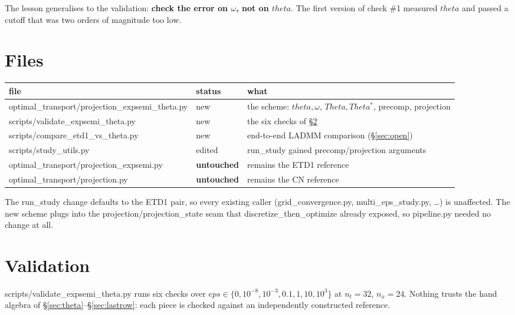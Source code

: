 \documentclass[11pt]{article}
\newcommand{\eps}{\varepsilon}
\newcommand{\dt}{\Delta t}
\newcommand{\dx}{\Delta x}
\newcommand{\code}[1]{\texttt{#1}}
\def\theta{theta}\def\Theta{Theta}\def\alpha{alpha}\def\rho{rho}%
\def\eps{eps}\def\dt{dt}\def\dx{dx}\def\code#1{#1}%
\begin{document}
The lesson generalises to the validation: \textbf{check the error on $\omega$, not on
$\theta$}. The first version of check \#1 measured $\theta$ and passed a cutoff that was
two orders of magnitude too low.

\section{Files}

\begin{center}
\begin{tabular}{@{}lll@{}}
\toprule
file & status & what \\
\midrule
\code{optimal\_transport/projection\_expsemi\_theta.py} & new
  & the scheme: $\theta,\omega$, $\Theta,\Theta^*$, precomp, projection \\
\code{scripts/validate\_expsemi\_theta.py} & new
  & the six checks of \S\ref{sec:validation} \\
\code{scripts/compare\_etd1\_vs\_theta.py} & new
  & end-to-end LADMM comparison (\S\ref{sec:open}) \\
\code{scripts/study\_utils.py} & edited
  & \code{run\_study} gained \code{precomp}/\code{projection} arguments \\
\code{optimal\_transport/projection\_expsemi.py} & \textbf{untouched}
  & remains the ETD1 reference \\
\code{optimal\_transport/projection.py} & \textbf{untouched}
  & remains the CN reference \\
\bottomrule
\end{tabular}
\end{center}

The \code{run\_study} change defaults to the ETD1 pair, so every existing caller
(\code{grid\_convergence.py}, \code{multi\_eps\_study.py}, \dots) is unaffected. The new
scheme plugs into the \code{projection}/\code{projection\_state} seam that
\code{discretize\_then\_optimize} already exposed, so \code{pipeline.py} needed no change
at all.

\section{Validation}
\label{sec:validation}

\code{scripts/validate\_expsemi\_theta.py} runs six checks over
$\eps\in\{0,10^{-8},10^{-3},0.1,1,10,10^3\}$ at $n_t=32$, $n_x=24$. Nothing trusts the
hand algebra of \S\ref{sec:theta}--\S\ref{sec:lastrow}: each piece is checked against an
independently constructed reference.
\end{document}
